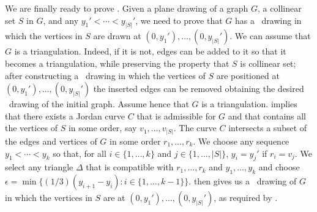 We are finally ready to prove . Given a plane drawing
of a graph $G$, a collinear set $S$ in $G$,
	and any $y_1'<\cdots<y_{|S|}'$, we need to prove that $G$ has
	a \Fary\ drawing in which the vertices in $S$ are drawn at
	$(0,y_1'),\ldots,(0,y_{|S|}')$. We can assume that $G$ is a triangulation. Indeed, if it is not,  edges can be added to it so that it becomes a triangulation, while preserving the property that $S$ is collinear set; after constructing a \Fary\ drawing in which the vertices of $S$ are positioned at $(0,y_1'),\ldots,(0,y_{|S|}')$ the inserted edges can be removed obtaining the desired \Fary\ drawing of the initial graph. Assume hence that $G$ is a triangulation. 	  implies
	that there exists a Jordan curve $C$ that is admissible for $G$
	and that contains all the vertices of $S$ in some order, say
	$v_1,\ldots,v_{|S|}$.  The curve $C$ intersects a subset of the edges
	and vertices of $G$ in some order $r_1,\ldots,r_k$.  We choose any
	sequence $y_1<\cdots<y_k$ so that, for all $i\in\{1,\ldots,k\}$ and
	$j\in\{1,\ldots,|S|\}$, $y_i = y_j'$ if $r_i=v_j$.  We select
	any triangle $\Delta$ that is compatible with $r_1,\ldots,r_k$ and
	$y_1,\ldots,y_k$ and choose $\epsilon = \min\{(1/3)(y_{i+1}-y_{i}):
	i\in\{1,\ldots,k-1\}\}$.   then gives us a \Fary\
	drawing of $G$ in which the vertices in $S$ are at $(0,y_1'),\ldots,(0,y_{|S|}')$, as required by .


